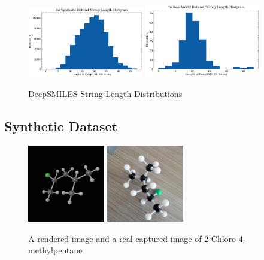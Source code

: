 \documentclass[12pt]{article}
\begin{document}
\begin{figure}[t]
    \centering
    \includegraphics[width=0.45\textwidth]{sy_len.png}
    \includegraphics[width=0.45\textwidth]{real_len.png}
    \caption{DeepSMILES String Length Distributions}
    \label{fig:dis}
\end{figure}

\subsection{Synthetic Dataset}
\begin{figure}[t]
    \centering
    \includegraphics[width=0.3\textwidth]{generated}
    \includegraphics[width=0.3\textwidth]{cap}
    \caption{A rendered image and a real captured image of 2-Chloro-4-methylpentane}
    \label{fig:example}
\end{figure}
\end{document}
